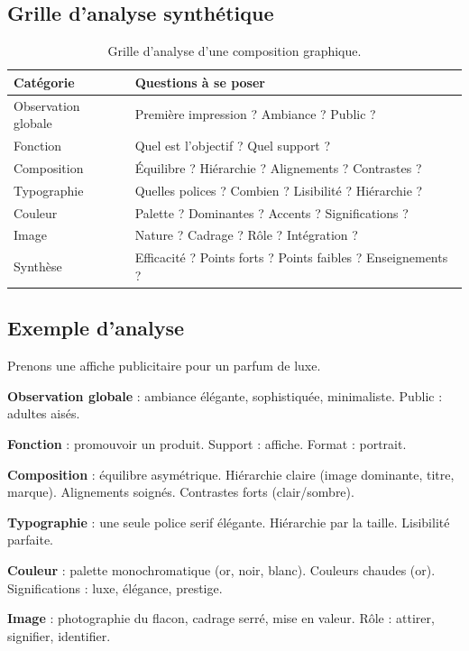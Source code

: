 \subsection{Grille d'analyse synthétique}

\begin{table}[h!]
\centering
\begin{tabular}{@{}p{3.5cm}p{10.5cm}@{}}
\toprule
\textbf{Catégorie} & \textbf{Questions à se poser} \\
\midrule
Observation globale & Première impression ? Ambiance ? Public ? \\
Fonction & Quel est l'objectif ? Quel support ? \\
Composition & Équilibre ? Hiérarchie ? Alignements ? Contrastes ? \\
Typographie & Quelles polices ? Combien ? Lisibilité ? Hiérarchie ? \\
Couleur & Palette ? Dominantes ? Accents ? Significations ? \\
Image & Nature ? Cadrage ? Rôle ? Intégration ? \\
Synthèse & Efficacité ? Points forts ? Points faibles ? Enseignements ? \\
\bottomrule
\end{tabular}
\caption{Grille d'analyse d'une composition graphique.}
\end{table}

\subsection{Exemple d'analyse}

Prenons une affiche publicitaire pour un parfum de luxe.

\textbf{Observation globale} : ambiance élégante, sophistiquée, minimaliste. Public : adultes aisés.

\textbf{Fonction} : promouvoir un produit. Support : affiche. Format : portrait.

\textbf{Composition} : équilibre asymétrique. Hiérarchie claire (image dominante, titre, marque). Alignements soignés. Contrastes forts (clair/sombre).

\textbf{Typographie} : une seule police serif élégante. Hiérarchie par la taille. Lisibilité parfaite.

\textbf{Couleur} : palette monochromatique (or, noir, blanc). Couleurs chaudes (or). Significations : luxe, élégance, prestige.

\textbf{Image} : photographie du flacon, cadrage serré, mise en valeur. Rôle : attirer, signifier, identifier.

